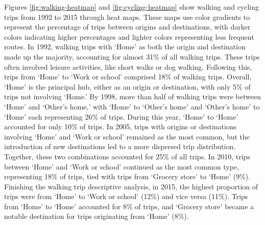 \documentclass[preprint, 3p,
authoryear]{elsarticle} %
\begin{document}
Figures \ref{fig:walking-heatmap} and \ref{fig:cycling-heatmap} show
walking and cycling trips from 1992 to 2015 through heat maps. These
maps use color gradients to represent the percentage of trips between
origins and destinations, with darker colors indicating higher
percentages and lighter colors representing less frequent routes. In
1992, walking trips with `Home' as both the origin and destination made
up the majority, accounting for almost 31\% of all walking trips. These
trips often involved leisure activities, like short walks or dog
walking. Following this, trips from `Home' to `Work or school' comprised
18\% of walking trips. Overall, `Home' is the principal hub, either as
an origin or destination, with only 5\% of trips not involving `Home.'
By 1998, more than half of walking trips were between `Home' and
`Other's home,' with `Home' to `Other's home' and `Other's home' to
`Home' each representing 26\% of trips. During this year, `Home' to
`Home' accounted for only 10\% of trips. In 2005, trips with origins or
destinations involving `Home' and `Work or school' remained as the most
common, but the introduction of new destinations led to a more dispersed
trip distribution. Together, these two combinations accounted for 25\%
of all trips. In 2010, trips between `Home' and `Work or school'
continued as the most common type, representing 18\% of trips, tied with
trips from `Grocery store' to `Home' (9\%). Finishing the walking trip
descriptive analysis, in 2015, the highest proportion of trips were from
`Home' to `Work or school' (12\%) and vice versa (11\%). Trips from
`Home' to `Home' accounted for 8\% of trips, and `Grocery store' became
a notable destination for trips originating from `Home' (8\%).
\end{document}

